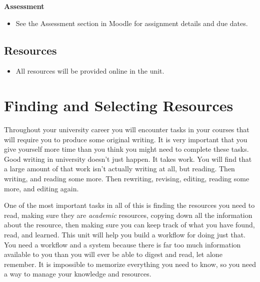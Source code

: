 \documentclass[
  letterpaper,
  DIV=11,
  numbers=noendperiod]{scrreprt}
\providecommand{\tightlist}{%
  \setlength{\itemsep}{0pt}\setlength{\parskip}{0pt}}\usepackage{longtable,booktabs,array}
\begin{document}
\begin{tcolorbox}[enhanced jigsaw, toprule=.15mm, colback=white, colframe=quarto-callout-note-color-frame, arc=.35mm, opacityback=0, breakable, rightrule=.15mm, bottomrule=.15mm, leftrule=.75mm, left=2mm]

\textbf{Assessment}

\begin{itemize}
\tightlist
\item
  See the Assessment section in Moodle for assignment details and due
  dates.
\end{itemize}

\end{tcolorbox}

\subsection*{Resources}\label{resources-1}

\begin{itemize}
\tightlist
\item
  All resources will be provided online in the unit.
\end{itemize}

\section{Finding and Selecting
Resources}\label{finding-and-selecting-resources}

Throughout your university career you will encounter tasks in your
courses that will require you to produce some original writing. It is
very important that you give yourself more time than you think you might
need to complete these tasks. Good writing in university doesn't just
happen. It takes work. You will find that a large amount of that work
isn't actually writing at all, but reading. Then writing, and reading
some more. Then rewriting, revising, editing, reading some more, and
editing again.

One of the most important tasks in all of this is finding the resources
you need to read, making sure they are \emph{academic} resources,
copying down all the information about the resource, then making sure
you can keep track of what you have found, read, and learned. This unit
will help you build a workflow for doing just that. You need a workflow
and a system because there is far too much information available to you
than you will ever be able to digest and read, let alone remember. It is
impossible to memorize everything you need to know, so you need a way to
manage your knowledge and resources.
\end{document}
